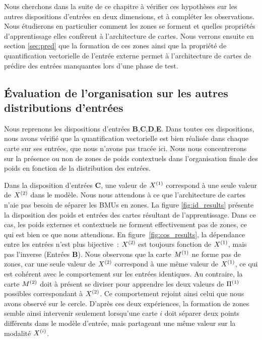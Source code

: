 \documentclass[../main]{subfiles}
\begin{document}
Nous cherchons dans la suite de ce chapitre à vérifier ces hypothèses sur les autres dispositions d'entrées en deux dimensions, et à compléter les observations.
Nous étudierons en particulier comment les zones se forment et quelles propriétés d'apprentissage elles confèrent à l'architecture de cartes.
Nous verrons ensuite en section \ref{sec:pred} que la formation de ces zones ainsi que la propriété de quantification vectorielle de l'entrée externe permet à l'architecture de cartes de prédire des entrées manquantes lors d'une phase de test.

\subsection{\'Evaluation de l'organisation sur les autres distributions d'entrées}

Nous reprenons les dispositions d'entrées \textbf{B},\textbf{C},\textbf{D},\textbf{E}.
Dans toutes ces dispositions, nous avons vérifié que la quantification vectorielle est bien réalisée dans chaque carte sur ses entrées, que nous n'avons pas tracée ici.
Nous nous concentrerons sur la présence ou non de zones de poids contextuels dans l'organisation finale des poids en fonction de la distribution des entrées.

Dans la disposition d'entrées \textbf{C}, une valeur de $X^{({1})}$ correspond à une seule valeur de $X^{({2})}$ dans le modèle. 
Nous nous attendons à ce que l'architecture de cartes n'aie pas besoin de séparer les BMUs en zones.
La figure \ref{fig:id_results} présente la disposition des poids et entrées des cartes résultant de l'apprentissage. 
Dans ce cas, les poids externes et contextuels ne forment effectivement pas de zones, ce qui est bien ce que nous attendions.
En figure~\ref{fig:cos_results}, la dépendance entre les entrées n'est plus bijective~: $X^{({2})}$ est toujours fonction de $X^{({1})}$, mais pas l'inverse (Entrées \textbf{B}). 
Nous observons que la carte $M^{({1})}$ ne forme pas de zones, car une seule valeur de $X^{({2})}$ correspond à une même valeur de $X^{({1})}$, ce qui est cohérent avec le comportement sur les entrées identiques.
Au contraire, la carte $M^{({2})}$ doit à présent se diviser pour apprendre les deux valeurs de $\Pi^{({1})}$ possibles correspondant à $X^{({2})}$. Ce comportement rejoint ainsi celui que nous avons observé sur le cercle.
D'après ces deux expériences, la formation de zones semble ainsi intervenir seulement lorsqu'une carte $i$ doit séparer deux points différents dans le modèle d'entrée, mais partageant une même valeur sur la modalité $X^{({i})}$.
\end{document}
